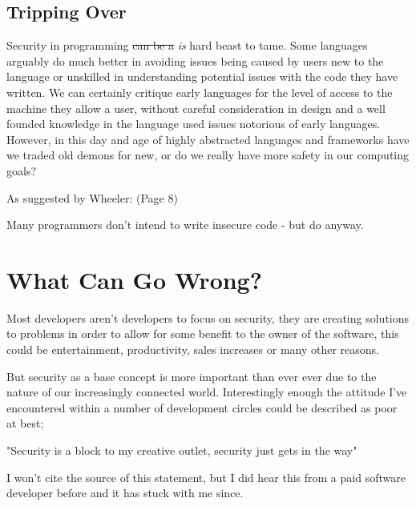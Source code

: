 \documentclass{IEEEtran}
\begin{document}
    \subsection{Tripping Over}
        Security in programming \sout{can be a} \textit{is} hard beast to tame. Some languages arguably do much better
        in avoiding issues being caused by users new to the language or unskilled in 
        understanding potential issues with the code they have written.
        We can certainly critique early languages for the level of access to the machine they allow 
        a user, without careful consideration in design and a well founded knowledge in the language 
        used issues notorious of early languages. However, in this day and age of highly abstracted 
        languages and frameworks have we traded old demons for new, or do we really have more safety
        in our computing goals?

        As suggested by Wheeler:\cite{Wheeler} (Page 8)
        \begin{displayquote}
            Many programmers don’t intend to write insecure code - but do anyway.
        \end{displayquote}


    \section{What Can Go Wrong?}
        Most developers aren't developers to focus on security, they are creating solutions to 
        problems in order to allow for some benefit to the owner of the software, this could 
        be entertainment, productivity, sales increases or many other reasons.

        But security as a base concept is more important than ever ever due to the nature of
        our increasingly connected world\cite{misovskisecure}. Interestingly enough the attitude I've encountered 
        within a number of development circles could be described as poor at best;
        \begin{displayquote}
            "Security is a block to my creative outlet, security just gets in the way"
        \end{displayquote}
        I won't cite the source of this statement, but I did hear this from a paid software developer
        before and it has stuck with me since.
\end{document}
